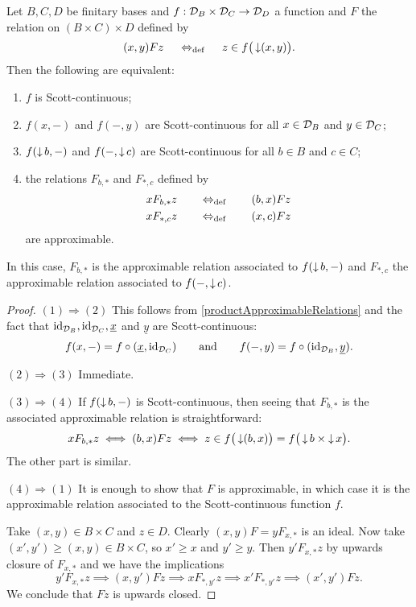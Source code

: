 \begin{proposition}
Let $B,C,D$ be finitary bases and $f: \mathcal{D}_B\times \mathcal{D}_C\to \mathcal{D}_D$ a function and $F$ the relation on $(B\times C)\times D$ defined by
\[ (x,y)Fz \;\quad\Leftrightarrow_{\text{def}}\quad\; z\in f\big(\operatorname{\downarrow} (x,y)\big). \]
Then the following are equivalent:
\begin{enumerate}
\item $f$ is Scott-continuous;
\item $f(x,-)$ and $f(-,y)$ are Scott-continuous for all $x\in \mathcal{D}_B$ and $y\in \mathcal{D}_C$;
\item $f(\operatorname{\downarrow} b,-)$ and $f(-,\operatorname{\downarrow} c)$ are Scott-continuous for all $b\in B$ and $c\in C$;
\item the relations $F_{b,*}$ and $F_{*,c}$ defined by
\begin{align*}
xF_{b,*}z \quad &\quad\Leftrightarrow_{\text{def}}\quad \quad (b,x)Fz \\
xF_{*,c}z \quad &\quad\Leftrightarrow_{\text{def}}\quad \quad (x,c)Fz
\end{align*}
are approximable.
\end{enumerate}
In this case, $F_{b,*}$ is the approximable relation associated to $f(\operatorname{\downarrow} b,-)$ and $F_{*,c}$ the approximable relation associated to $f(-,\operatorname{\downarrow} c)$.
\end{proposition}
\begin{proof}
$(1) \Rightarrow (2)$ This follows from \ref{productApproximableRelations} and the fact that $\operatorname{id}_{\mathcal{D}_B}, \operatorname{id}_{\mathcal{D}_C}, \underline{x}$ and $\underline{y}$ are Scott-continuous:
\[ f(x, -) = f \circ (\underline{x}, \operatorname{id}_{\mathcal{D}_C}) \qquad\text{and}\qquad f(-, y) = f \circ (\operatorname{id}_{\mathcal{D}_B}, \underline{y}). \]

$(2) \Rightarrow (3)$ Immediate.

$(3) \Rightarrow (4)$ If $f(\operatorname{\downarrow} b,-)$ is Scott-continuous, then seeing that $F_{b,*}$ is the associated approximable relation is straightforward:
\[ xF_{b,*}z \iff (b,x)Fz \iff z \in f\big(\operatorname{\downarrow} (b,x)\big) = f\big(\operatorname{\downarrow} b \times \operatorname{\downarrow} x\big). \]
The other part is similar.

$(4) \Rightarrow (1)$ It is enough to show that $F$ is approximable, in which case it is the approximable relation associated to the Scott-continuous function $f$.

Take $(x,y)\in B\times C$ and $z\in D$. Clearly $(x,y)F = yF_{x,*}$ is an ideal. Now take $(x',y')\geq (x,y)\in B\times C$, so $x'\geq x$ and $y'\geq y$. Then $y'F_{x,*}z$ by upwards closure of $F_{x,*}$ and we have the implications
\[ y'F_{x,*}z \implies (x,y')Fz \implies xF_{*,y'}z \implies x'F_{*,y'}z \implies (x',y')Fz. \]
We conclude that $Fz$ is upwards closed.
\end{proof}

